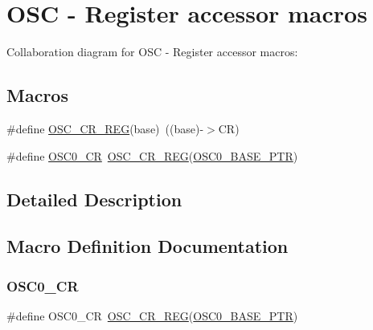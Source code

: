 \hypertarget{group___o_s_c___register___accessor___macros}{}\section{O\+SC -\/ Register accessor macros}
\label{group___o_s_c___register___accessor___macros}
Collaboration diagram for O\+SC -\/ Register accessor macros\+:
\subsection*{Macros}
\begin{DoxyCompactItemize}
\item 
\#define \hyperlink{group___o_s_c___register___accessor___macros_gabcb7eab28c1f1c1d2b742a84f826de10}{O\+S\+C\+\_\+\+C\+R\+\_\+\+R\+EG}(base)~((base)-\/$>$CR)
\item 
\#define \hyperlink{group___o_s_c___register___accessor___macros_ga55e7ae8d61b1c66e1c673163c8c0a10e}{O\+S\+C0\+\_\+\+CR}~\hyperlink{group___o_s_c___register___accessor___macros_gabcb7eab28c1f1c1d2b742a84f826de10}{O\+S\+C\+\_\+\+C\+R\+\_\+\+R\+EG}(\hyperlink{group___o_s_c___peripheral_gaab1618c69a91b2e5d3385139b5b566f0}{O\+S\+C0\+\_\+\+B\+A\+S\+E\+\_\+\+P\+TR})
\end{DoxyCompactItemize}


\subsection{Detailed Description}


\subsection{Macro Definition Documentation}
\mbox{\label{group___o_s_c___register___accessor___macros_ga55e7ae8d61b1c66e1c673163c8c0a10e}} 
\subsubsection{\texorpdfstring{O\+S\+C0\+\_\+\+CR}{OSC0\_CR}}
{\footnotesize\ttfamily \#define O\+S\+C0\+\_\+\+CR~\hyperlink{group___o_s_c___register___accessor___macros_gabcb7eab28c1f1c1d2b742a84f826de10}{O\+S\+C\+\_\+\+C\+R\+\_\+\+R\+EG}(\hyperlink{group___o_s_c___peripheral_gaab1618c69a91b2e5d3385139b5b566f0}{O\+S\+C0\+\_\+\+B\+A\+S\+E\+\_\+\+P\+TR})}

